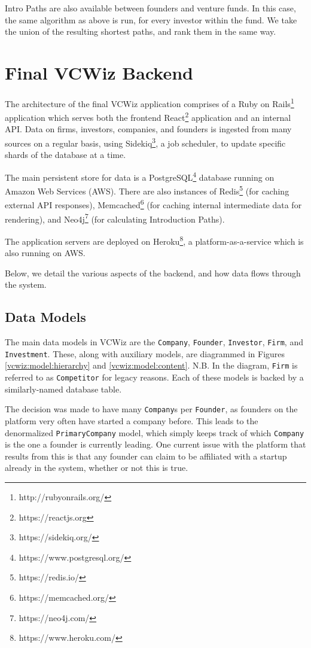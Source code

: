 Intro Paths are also available between founders and venture funds. In this case, the same algorithm as above is run, for every investor within the fund. We take the union of the resulting shortest paths, and rank them in the same way.

\section{Final VCWiz Backend}

The architecture of the final VCWiz application comprises of a Ruby on Rails\footnote{http://rubyonrails.org/} application which serves both the frontend React\footnote{https://reactjs.org} application and an internal API. Data on firms, investors, companies, and founders is ingested from many sources on a regular basis, using Sidekiq\footnote{https://sidekiq.org/}, a job scheduler, to update specific shards of the database at a time.


The main persistent store for data is a PostgreSQL\footnote{https://www.postgresql.org/} database running on Amazon Web Services (AWS). There are also instances of Redis\footnote{https://redis.io/} (for caching external API responses), Memcached\footnote{https://memcached.org/} (for caching internal intermediate data for rendering), and Neo4j\footnote{https://neo4j.com/} (for calculating Introduction Paths).

The application servers are deployed on Heroku\footnote{https://www.heroku.com/}, a platform-as-a-service which is also running on AWS.

Below, we detail the various aspects of the backend, and how data flows through the system.

\subsection{Data Models}

The main data models in VCWiz are the \texttt{Company}, \texttt{Founder}, \texttt{Investor}, \texttt{Firm}, and \texttt{Investment}. These, along with auxiliary models, are diagrammed in Figures \ref{vcwiz:model:hierarchy} and \ref{vcwiz:model:content}. N.B. In the diagram, \texttt{Firm} is referred to as \texttt{Competitor} for legacy reasons. Each of these models is backed by a similarly-named database table.

The decision was made to have many \texttt{Company}s per \texttt{Founder}, as founders on the platform very often have started a company before. This leads to the denormalized \texttt{PrimaryCompany} model, which simply keeps track of which \texttt{Company} is the one a founder is currently leading. One current issue with the platform that results from this is that any founder can claim to be affiliated with a startup already in the system, whether or not this is true.


